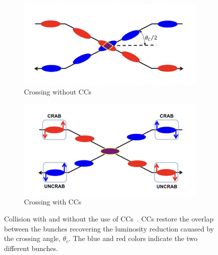 \begin{figure}[!ht]
    \centering
    \begin{subfigure}[t]{0.45\textwidth}
        \centering
        \includegraphics[width=1\textwidth]{images/introduction/no_crab_crossing.png}
        \caption{Crossing without CCs}
    \end{subfigure}
    \hfill
    \begin{subfigure}[t]{0.45\textwidth}
        \centering
        \includegraphics[width=1\textwidth]{images/introduction/crab_crossing.png}
        \caption{Crossing with CCs}
    \end{subfigure}
    \hfill
     \caption{Collision with and without the use of CCs~\cite{Verdú-Andrés:2263119}. CCs restore the overlap between the bunches recovering the luminosity reduction cauased by the crossing angle, $\theta_c$. The blue and red colors indicate the two different bunches.} 
     \label{fig:crossing_with_and_without_CCs}
 \end{figure}


